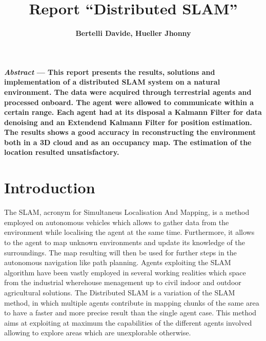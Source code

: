 \documentclass[twocolumn, a4paper]{article}
\begin{document}
\title{
    \Large\textbf{Report ``Distributed SLAM''}
	  }
\author{
		\textbf{Bertelli Davide, Hueller Jhonny} \\
	   }
\date{}
\maketitle

\textbf{
    {\em{\footnotesize{Abstract}}}%
    \small --- This report presents the results,
    solutions and implementation of a distributed SLAM system
    on a natural environment. The data were acquired through
    terrestrial agents and processed onboard. The agent were
    allowed to communicate within a certain range. Each agent
    had at its disposal a Kalmann Filter for data denoising
    and an Extendend Kalmann Filter for position estimation.
    The results shows a good accuracy in reconstructing the
    environment both in a 3D cloud and as an occupancy map.
    The estimation of the location resulted unsatisfactory.
    }

\section{Introduction}
The SLAM, acronym for Simultaneus Localisation And Mapping, is a method
employed on autonomous vehicles which allows to gather data from the
environment while localising the agent at the same time. Furthermore, it
allows to the agent to map unknown environments and update its knowledge
of the surroundings. The map resulting will then be used for further steps
in the autonomous navigation like path planning.
Agents exploiting the SLAM algorithm have been vastly employed in several
working realities which space from the industrial wherehouse menagement
up to civil indoor and outdoor agricultural solutions.
The Distributed SLAM is a variation of the SLAM method, in which multiple
agents contribute in mapping chunks of the same area to have a faster and
more precise result than the single agent case. This method aims at
exploiting at maximum the capabilities of the different agents involved
allowing to explore areas which are unexplorable otherwise.
\end{document}
